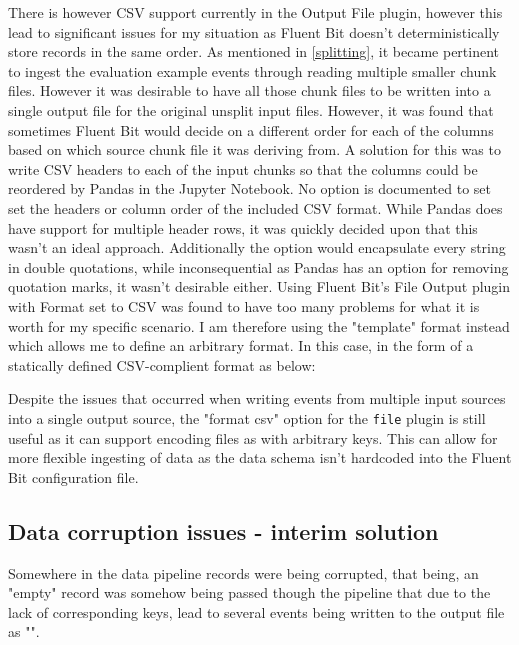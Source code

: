 There is however CSV support currently in the Output File plugin, however this lead to significant issues for my situation as Fluent Bit doesn't deterministically store records in the same order. As mentioned in \ref{splitting}, it became pertinent to ingest the evaluation example events through reading multiple smaller chunk files. However it was desirable to have all those chunk files to be written into a single output file for the original unsplit input files. However, it was found that sometimes Fluent Bit would decide on a different order for each of the columns based on which source chunk file it was deriving from. A solution for this was to write CSV headers to each of the input chunks so that the columns could be reordered by Pandas in the Jupyter Notebook. No option is documented to set set the headers or column order of the included CSV format. While Pandas does have support for multiple header rows, it was quickly decided upon that this wasn't an ideal approach. Additionally the option would encapsulate every string in double quotations, while inconsequential as Pandas has an option for removing quotation marks, it wasn't desirable either. Using Fluent Bit's File Output plugin with Format set to CSV was found to have too many problems for what it is worth for my specific scenario. I am therefore using the "template" format instead which allows me to define an arbitrary format. In this case, in the form of a statically defined CSV-complient format as below:



Despite the issues that occurred when writing events from multiple input sources into a single output source, the "format csv" option for the \texttt{file} plugin is still useful as it can support encoding files as with arbitrary keys. This can allow for more flexible ingesting of data as the data schema isn't hardcoded into the Fluent Bit configuration file.

\subsection{Data corruption issues - interim solution}
Somewhere in the data pipeline records were being corrupted, that being, an "empty" record was somehow being passed though the pipeline that due to the lack of corresponding keys, lead to several events being written to the output file as "\texttt{}".

